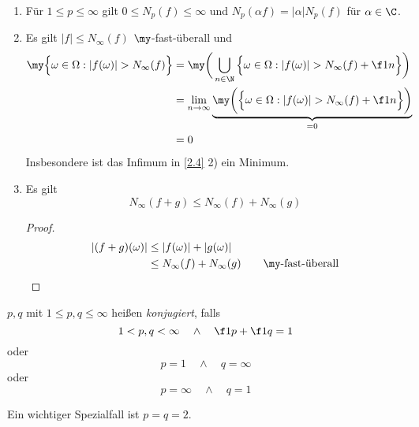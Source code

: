 \documentclass{mycourse}
\begin{document}
\begin{st}[Eigenschaften] \label{2.5}
	\begin{enumerate}[1)]
		\item
			Für $1 \le p \le \infty$ gilt $0 \le N_p(f) \le \infty$ und $N_p(\alpha f) = |\alpha| N_p(f)$ für $\alpha \in \C$.
		\item
			Es gilt $|f| \le N_\infty(f)$ $\my$-fast-überall und
			\begin{align*}
				\my \Big\{ \omega \in \Omega : |f(\omega)| > N_\infty(f) \Big\}
				&= \my \bigg( \bigcup_{n\in \N} \Big\{ \omega \in \Omega : |f(\omega)| > N_\infty(f) + \f 1n \Big\} \bigg) \\
				&= \lim_{n\to \infty }\underbrace{\my \bigg( \Big\{ \omega \in \Omega : |f(\omega)| > N_\infty(f) + \f 1n \Big\} \bigg)}_{=0} \\
				&=  0
			\end{align*}
			Insbesondere ist das Infimum in \ref{2.4} 2) ein Minimum.
		\item
			Es gilt
			\[
				N_\infty(f+g) \le N_\infty (f) + N_\infty(g)
			\]
			\begin{proof}
				\begin{align*}
					|(f+g)(\omega)|
					& \le |f(\omega)| + |g(\omega)| \\
					& \le N_\infty(f) + N_\infty(g) \qquad \text{$\my$-fast-überall}
				\end{align*}
			\end{proof}
	\end{enumerate}
\end{st}

\begin{df} \label{2.6}
	$p,q$ mit $1 \le p,q \le \infty$ heißen \emph{konjugiert}, falls
	\[
		1 < p, q < \infty \quad\land\quad \f 1p + \f 1q = 1
	\]
	oder
	\[
		p = 1 \quad\land\quad q = \infty
	\]
	oder
	\[
		p = \infty \quad\land\quad q = 1
	\]
	\begin{note}
		Ein wichtiger Spezialfall ist $p=q=2$.
	\end{note}
\end{df}
\end{document}
